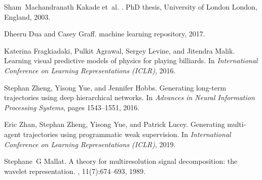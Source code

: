 \documentclass{article}
\begin{document}
\begin{thebibliography}{10}
Sham~Machandranath Kakade et~al.
.
\newblock PhD thesis, University of London London, England, 2003.

Dheeru Dua and Casey Graff.
 machine learning repository, 2017.

Katerina Fragkiadaki, Pulkit Agrawal, Sergey Levine, and Jitendra Malik.
\newblock Learning visual predictive models of physics for playing billiards.
\newblock In {\em International Conference on Learning Representations (ICLR)},
  2016.

Stephan Zheng, Yisong Yue, and Jennifer Hobbs.
\newblock Generating long-term trajectories using deep hierarchical networks.
\newblock In {\em Advances in Neural Information Processing Systems}, pages
  1543--1551, 2016.

Eric Zhan, Stephan Zheng, Yisong Yue, and Patrick Lucey.
\newblock Generating multi-agent trajectories using programmatic weak
  supervision.
\newblock In {\em International Conference on Learning Representations (ICLR)},
  2019.

Stephane~G Mallat.
\newblock A theory for multiresolution signal decomposition: the wavelet
  representation.
,
  11(7):674--693, 1989.

\end{thebibliography}
\end{document}
